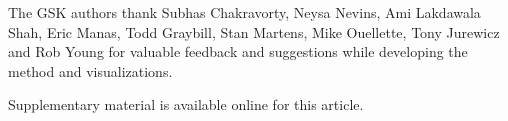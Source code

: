 \documentclass[journal=jacsat,manuscript=article]{achemso}
\begin{document}
\begin{acknowledgement}
  The GSK authors thank Subhas Chakravorty, Neysa Nevins, Ami Lakdawala Shah,
  Eric Manas, Todd Graybill, Stan Martens, Mike Ouellette, Tony Jurewicz and Rob
  Young for valuable feedback and suggestions while developing the method and
  visualizations.
\end{acknowledgement}

\begin{suppinfo}
Supplementary material is available online for this article.
\end{suppinfo}


\end{document}
